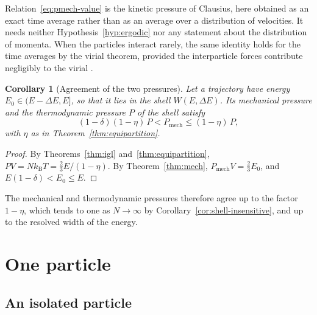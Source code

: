 \documentclass[11pt,a4paper]{article}
\newtheorem{corollary}[theorem]{Corollary}
\theoremstyle{definition}
\theoremstyle{remark}
\newcommand{\kB}{k_{\mathrm{B}}}
\newcommand{\Pmech}{P_{\mathrm{mech}}}
\begin{document}
Relation~\eqref{eq:pmech-value} is the kinetic pressure of Clausius, here obtained as an exact time average rather than as an average over a distribution of velocities.
It needs neither Hypothesis~\ref{hyp:ergodic} nor any statement about the distribution of momenta.
When the particles interact rarely, the same identity holds for the time averages by the virial theorem, provided the interparticle forces contribute negligibly to the virial \citep{clausius1870}.

\begin{corollary}[Agreement of the two pressures]
\label{cor:agreement}
Let a trajectory have energy $E_0\in(E-\Delta E,E]$, so that it lies in the shell $W(E,\Delta E)$.
Its mechanical pressure and the thermodynamic pressure $P$ of the shell satisfy
\begin{equation}
(1-\delta)(1-\eta)\,P<\Pmech\le(1-\eta)\,P,
\label{eq:agreement}
\end{equation}
with $\eta$ as in Theorem~\ref{thm:equipartition}.
\end{corollary}

\begin{proof}
By Theorems~\ref{thm:igl} and~\ref{thm:equipartition}, $PV=N\kB T=\tfrac23E/(1-\eta)$.
By Theorem~\ref{thm:mech}, $\Pmech V=\tfrac23E_0$, and $E(1-\delta)<E_0\le E$.
\end{proof}

The mechanical and thermodynamic pressures therefore agree up to the factor $1-\eta$, which tends to one as $N\to\infty$ by Corollary~\ref{cor:shell-insensitive}, and up to the resolved width of the energy.

\section{One particle}
\label{sec:single}

\subsection{An isolated particle}
\end{document}

